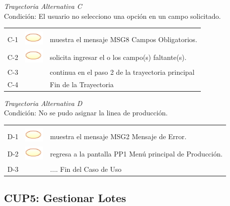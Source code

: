 \documentclass[10pt,spanish]{article}
\providecommand{\tabularnewline}{\\}
\begin{document}
	
	\textit{Trayectoria Alternativa C}\\
	Condición: El usuario no selecciono una opción en un campo solicitado.\\
	\begin{tabular}{ccl}
	& & \tabularnewline
	C-1 & \includegraphics{sistema} & muestra el mensaje MSG8 Campos Obligatorios.\tabularnewline	
	C-2 & \includegraphics{sistema} & solicita ingresar el o los campo(s) faltante(s).\tabularnewline		
	C-3 & & continua en el paso 2 de la trayectoria principal\tabularnewline
	C-4 & & Fin de la Trayectoria\tabularnewline	
	\end{tabular}	
	
	\textit{Trayectoria Alternativa D}\\
	Condición: No se pudo asignar la linea de producción.\\
	\begin{tabular}{ccl}
	& & \tabularnewline
	D-1 & \includegraphics{sistema} & muestra el mensaje MSG2 Mensaje de Error.\tabularnewline	
	D-2 & \includegraphics{sistema} & regresa a la pantalla PP1 Menú principal de Producción.\tabularnewline		
	D-3 & & .... Fin del Caso de Uso\tabularnewline
	\end{tabular}				
\newpage
\subsection{CUP5: Gestionar Lotes}
\end{document}

